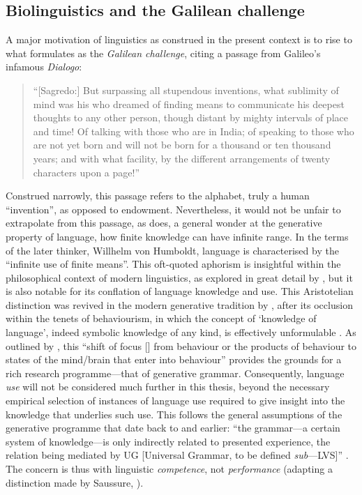 \subsection{Biolinguistics and the Galilean challenge}\label{sec:110}

A major motivation of linguistics as construed in the present context is to rise to what \textcite[i.a.]{ChomskyN_2017a} formulates as the \textit{Galilean challenge}, citing a passage from Galileo's infamous \textit{Dialogo}:

\begin{quote}
    ``[Sagredo:] But surpassing all stupendous inventions, what sublimity of mind was his who dreamed of finding means to communicate his deepest thoughts to any other person, though distant by mighty intervals of place and time! Of talking with those who are in India; of speaking to those who are not yet born and will not be born for a thousand or ten thousand years; and with what facility, by the different arrangements of twenty characters upon a page!'' \parencite[105]{Galileo_1967}
\end{quote}

Construed narrowly, this passage refers to the alphabet, truly a human ``invention'', as opposed to endowment. Nevertheless, it would not be unfair to extrapolate from this passage, as \textcite{ChomskyN_2017a} does, a general wonder at the generative property of language, how finite knowledge can have infinite range. In the terms of the later thinker, Willhelm von Humboldt, language is characterised by the ``infinite use of finite means''. This oft-quoted aphorism is insightful within the philosophical context of modern linguistics, as explored in great detail by \textcite{ChomskyN_1966}, but it is also notable for its conflation of language knowledge and use. This Aristotelian distinction was revived in the modern generative tradition by \textcite{ChomskyN_1965}, after its occlusion within the tenets of behaviourism, in which the concept of `knowledge of language', indeed symbolic knowledge of any kind, is effectively unformulable \parencite[cf.][]{ChomskyN_1959,GallistelCR.KingAP_2010}. As outlined by \textcite[3]{ChomskyN_1986a}, this ``shift of focus [] from behaviour or the products of behaviour to states of the mind/brain that enter into behaviour'' provides the grounds for a rich research programme---that of generative grammar. Consequently, language \textit{use} will not be considered much further in this thesis, beyond the necessary empirical selection of instances of language use required to give insight into the knowledge that underlies such use. This follows the general assumptions of the generative programme that date back to \textcite{ChomskyN_1981} and earlier: ``the grammar---a certain system of knowledge---is only indirectly related to presented experience, the relation being mediated by UG [Universal Grammar, to be defined \textit{sub}---LVS]'' \parencite[4]{ChomskyN_1981}. The concern is thus with linguistic \textit{competence}, not \textit{performance} (adapting a distinction made by Saussure, ).

